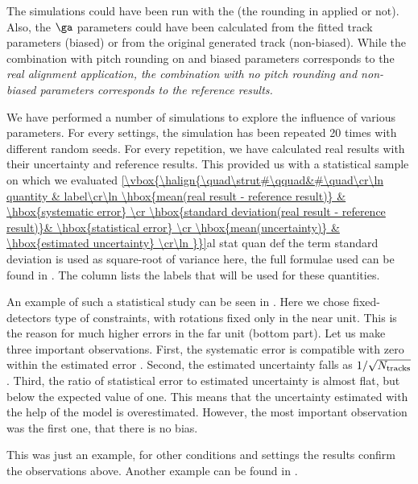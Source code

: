 
The simulations could have been run with the  (the rounding in  applied or not). Also, the $\ga$ parameters could have been calculated from the fitted track parameters (biased) or from the original generated track (non-biased). While the combination with pitch rounding on and biased parameters corresponds to the \em{real} alignment application, the combination with no pitch rounding and non-biased parameters corresponds to the \em{reference} results.

We have performed a number of simulations to explore the influence of various parameters. For every settings, the simulation has been repeated 20 times with different random seeds. For every repetition, we have calculated real results with their uncertainty and reference results. This provided us with a statistical sample on which we evaluated
\eqref{\vbox{\halign{\quad\strut#\qquad&#\quad\cr\ln
quantity & label\cr\ln
\hbox{mean(real result - reference result)}	& \hbox{systematic error} \cr
\hbox{standard deviation(real result - reference result)}& \hbox{statistical error} \cr
\hbox{mean(uncertainty)} 					& \hbox{estimated uncertainty} \cr\ln
}}}{al stat quan def}
the term standard deviation is used as square-root of variance here, the full formulae used can be found in . The \rhs{} column lists the labels that will be used for these quantities.

An example of such a statistical study can be seen in . Here we chose fixed-detectors type of constraints, with rotations fixed only in the near unit. This is the reason for much higher errors in the far unit (bottom part). Let us make three important observations. First, the systematic error is compatible with zero within the estimated error . Second, the estimated uncertainty falls as $1/\sqrt{N_{\rm tracks}}$. Third, the ratio of statistical error to estimated uncertainty is almost flat, but below the expected value of one. This means that the uncertainty estimated with the help of the model  is overestimated. However, the most important observation was the first one, that there is no bias.

This was just an example, for other conditions and settings the results confirm the observations above. Another example can be found in .


